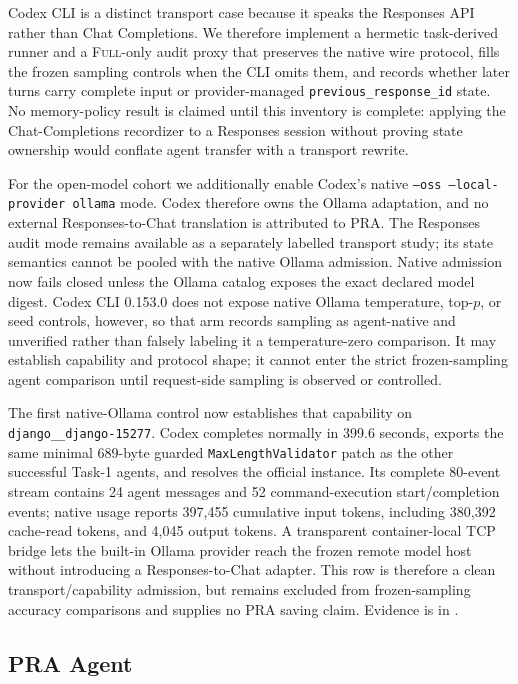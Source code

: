 \documentclass[11pt]{article}
\begin{document}
Codex CLI is a distinct transport case because it speaks the Responses API
rather than Chat Completions.  We therefore implement a hermetic task-derived
runner and a \textsc{Full}-only audit proxy that preserves the native wire
protocol, fills the frozen sampling controls when the CLI omits them, and
records whether later turns carry complete input or provider-managed
\texttt{previous\_response\_id} state.  No memory-policy result is claimed
until this inventory is complete: applying the Chat-Completions recordizer to
a Responses session without proving state ownership would conflate agent
transfer with a transport rewrite.

For the open-model cohort we additionally enable Codex's native
\texttt{--oss --local-provider ollama} mode.  Codex therefore owns the Ollama
adaptation, and no external Responses-to-Chat translation is attributed to
PRA.  The Responses audit mode remains available as a separately labelled
transport study; its state semantics cannot be pooled with the native Ollama
admission.  Native admission now fails closed unless the Ollama catalog exposes
the exact declared model digest.  Codex CLI 0.153.0 does not expose native
Ollama temperature, top-$p$, or seed controls, however, so that arm records
sampling as agent-native and unverified rather than falsely labeling it a
temperature-zero comparison.  It may establish capability and protocol shape;
it cannot enter the strict frozen-sampling agent comparison until request-side
sampling is observed or controlled.

The first native-Ollama control now establishes that capability on
\texttt{django\_\_django-15277}.  Codex completes normally in 399.6 seconds,
exports the same minimal 689-byte guarded \texttt{MaxLengthValidator} patch as
the other successful Task-1 agents, and resolves the official instance.  Its
complete 80-event stream contains 24 agent messages and 52 command-execution
start/completion events; native usage reports 397,455 cumulative input tokens,
including 380,392 cache-read tokens, and 4,045 output tokens.  A transparent
container-local TCP bridge lets the built-in Ollama provider reach the frozen
remote model host without introducing a Responses-to-Chat adapter.  This row
is therefore a clean transport/capability admission, but remains excluded from
frozen-sampling accuracy comparisons and supplies no PRA saving claim.
Evidence is in
.

\subsection{PRA Agent}
\end{document}
